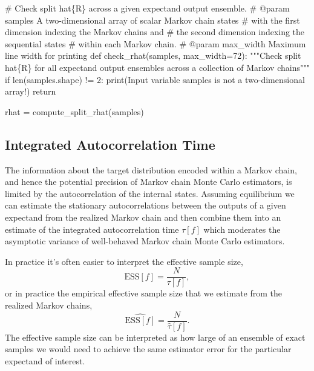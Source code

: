 \documentclass[
  letterpaper,
  DIV=11,
  numbers=noendperiod]{scrartcl}
\newenvironment{Shaded}{\begin{snugshade}}{\end{snugshade}}
\newcommand{\BuiltInTok}[1]{\textcolor[rgb]{0.00,0.23,0.31}{#1}}
\newcommand{\CommentTok}[1]{\textcolor[rgb]{0.37,0.37,0.37}{#1}}
\newcommand{\ControlFlowTok}[1]{\textcolor[rgb]{0.00,0.23,0.31}{#1}}
\newcommand{\DecValTok}[1]{\textcolor[rgb]{0.68,0.00,0.00}{#1}}
\newcommand{\KeywordTok}[1]{\textcolor[rgb]{0.00,0.23,0.31}{#1}}
\newcommand{\NormalTok}[1]{\textcolor[rgb]{0.00,0.23,0.31}{#1}}
\newcommand{\OperatorTok}[1]{\textcolor[rgb]{0.37,0.37,0.37}{#1}}
\newcommand{\StringTok}[1]{\textcolor[rgb]{0.13,0.47,0.30}{#1}}
\begin{document}
\begin{Shaded}
\begin{Highlighting}[]
\CommentTok{\# Check split hat\{R\} across a given expectand output ensemble.}
\CommentTok{\# @param samples A two{-}dimensional array of scalar Markov chain states}
\CommentTok{\#                with the first dimension indexing the Markov chains and}
\CommentTok{\#                the second dimension indexing the sequential states}
\CommentTok{\#                within each Markov chain.}
\CommentTok{\# @param max\_width Maximum line width for printing}
\KeywordTok{def}\NormalTok{ check\_rhat(samples, max\_width}\OperatorTok{=}\DecValTok{72}\NormalTok{):}
  \CommentTok{"""Check split hat\{R\} for all expectand output ensembles across}
\CommentTok{     a collection of Markov chains"""}
  \ControlFlowTok{if} \BuiltInTok{len}\NormalTok{(samples.shape) }\OperatorTok{!=} \DecValTok{2}\NormalTok{:}
    \BuiltInTok{print}\NormalTok{(}\StringTok{\textquotesingle{}Input variable \textasciigrave{}samples\textasciigrave{} is not a two{-}dimensional array!\textquotesingle{}}\NormalTok{)}
    \ControlFlowTok{return}
    
\NormalTok{  rhat }\OperatorTok{=}\NormalTok{ compute\_split\_rhat(samples)}
\end{Highlighting}
\end{Shaded}

\subsection{Integrated Autocorrelation
Time}\label{integrated-autocorrelation-time}

The information about the target distribution encoded within a Markov
chain, and hence the potential precision of Markov chain Monte Carlo
estimators, is limited by the autocorrelation of the internal states.
Assuming equilibrium we can estimate the stationary autocorrelations
between the outputs of a given expectand from the realized Markov chain
and then combine them into an estimate of the integrated autocorrelation
time \(\tau[f]\) which moderates the asymptotic variance of well-behaved
Markov chain Monte Carlo estimators.

In practice it's often easier to interpret the effective sample size, \[
\text{ESS}[f] = \frac{N}{\tau[f]},
\] or in practice the empirical effective sample size that we estimate
from the realized Markov chains, \[
\hat{\text{ESS}[f]} = \frac{N}{\hat{\tau}[f]}.
\] The effective sample size can be interpreted as how large of an
ensemble of exact samples we would need to achieve the same estimator
error for the particular expectand of interest.
\end{document}
